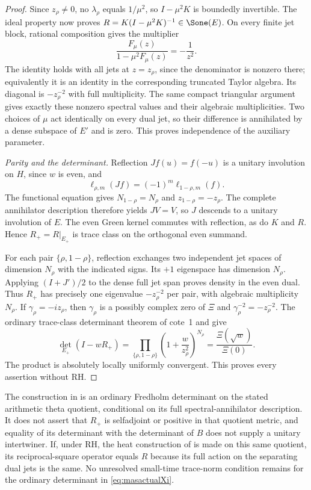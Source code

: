 \begin{proof}
Since $z_\rho\ne0$, no $\lambda_\rho$ equals $1/\mu^2$, so $I-\mu^2K$ is boundedly invertible. The ideal property now proves
$R=K(I-\mu^2K)^{-1}\in\Sone(E)$. On every finite jet block, rational composition gives the multiplier
\[
 \frac{F_\mu(z)}{1-\mu^2F_\mu(z)}=-\frac1{z^2}.
\]
The identity holds with all jets at $z=z_\rho$, since the denominator is nonzero there; equivalently it is an identity in the corresponding truncated Taylor algebra. Its diagonal is $-z_\rho^{-2}$ with full multiplicity. The same compact triangular argument gives exactly these nonzero spectral values and their algebraic multiplicities. Two choices of $\mu$ act identically on every dual jet, so their difference is annihilated by a dense subspace of $E'$ and is zero. This proves independence of the auxiliary parameter.

\emph{Parity and the determinant.}
Reflection $Jf(u)=f(-u)$ is a unitary involution on $H$, since $w$ is even, and
\[
 \ell_{\rho,m}(Jf)=(-1)^m\ell_{1-\rho,m}(f).
\]
The functional equation gives $N_{1-\rho}=N_\rho$ and $z_{1-\rho}=-z_\rho$. The complete annihilator description therefore yields $JV=V$, so $J$ descends to a unitary involution of $E$. The even Green kernel commutes with reflection, as do $K$ and $R$. Hence $R_+=R|_{E_+}$ is trace class on the orthogonal even summand.

For each pair $\{\rho,1-\rho\}$, reflection exchanges two independent jet spaces of dimension $N_\rho$ with the indicated signs. Its $+1$ eigenspace has dimension $N_\rho$. Applying $(I+J')/2$ to the dense full jet span proves density in the even dual. Thus $R_+$ has precisely one eigenvalue $-z_\rho^{-2}$ per pair, with algebraic multiplicity $N_\rho$. If $\gamma_\rho=-iz_\rho$, then $\gamma_\rho$ is a possibly complex zero of $\Xi$ and $\gamma_\rho^{-2}=-z_\rho^{-2}$. The ordinary trace-class determinant theorem of cote~1 and  give
\[
 \det_{E_+}(I-wR_+)
 =\prod_{\{\rho,1-\rho\}}
 \left(1+\frac{w}{z_\rho^2}\right)^{N_\rho}
 =\frac{\Xi(\sqrt w)}{\Xi(0)}.
\]
The product is absolutely locally uniformly convergent. This proves every assertion without RH.
\end{proof}

The construction in  is an ordinary Fredholm determinant on the stated arithmetic theta quotient, conditional on its full spectral-annihilator description. It does not assert that $R_+$ is selfadjoint or positive in that quotient metric, and equality of its determinant with the determinant of $B$ does not supply a unitary intertwiner. If, under RH, the heat construction of  is made on this same quotient, its reciprocal-square operator equals $R$ because its full action on the separating dual jets is the same. No unresolved small-time trace-norm condition remains for the ordinary determinant in \eqref{eq:masactualXi}.
